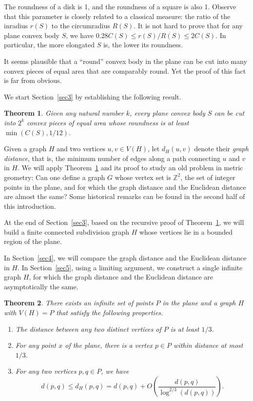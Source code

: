 \documentclass[12pt]{article}
\theoremstyle{plain}
\newtheorem{theorem}{Theorem}
\theoremstyle{definition}
\theoremstyle{remark}
\newcommand{\ZZ}{{\mathbb Z}}
\begin{document}
The roundness of a disk is 1, and the roundness of a square is also 1. Observe that this parameter is closely related to a classical measure: the ratio of the inradius $r(S)$ to the circumradius $R(S)$. It is not hard to prove that for any plane convex body $S$, we have $0.28C(S)\le r(S)/R(S)\le2C(S)$. In particular, the more elongated $S$ is, the lower its roundness.

It seems plausible that a ``round'' convex body in the plane can be cut into many convex pieces of equal area that are comparably round. Yet the proof of this fact is far from obvious.

We start Section~\ref{sec3} by establishing the following result.

\begin{theorem}\label{fat}
Given any natural number $k$, every plane convex body $S$ can be cut into $2^k$ convex pieces of equal area whose roundness is at least $\min(C(S),1/12)$.
\end{theorem}

Given a graph $H$ and two vertices $u,v\in V(H)$, let $d_H(u,v)$ denote their \emph{graph distance}, that is, the minimum number of edges along a path connecting $u$ and $v$ in $H$. We will apply Theorem~\ref{fat} and its proof to study an old problem in metric geometry: Can one define a graph $G$ whose vertex set is ${\ZZ}^2$, the set of integer points in the plane, and for which the graph distance and the Euclidean distance are almost the same? Some historical remarks can be found in the second half of this introduction.

At the end of Section~\ref{sec3}, based on the recursive proof of Theorem~\ref{fat}, we will build a finite connected subdivision graph $H$ whose vertices lie in a bounded region of the plane.
\smallskip

In Section~\ref{sec4}, we will compare the graph distance and the Euclidean distance in $H$. In Section~\ref{sec5}, using a limiting argument, we construct a single infinite graph $H$, for which the graph distance and the Euclidean distance are asymptotically the same.

\begin{theorem}\label{generalizedpinwheel}
There exists an infinite set of points $P$ in the plane and a graph $H$ with $V(H)=P$ that satisfy the following properties.
\begin{enumerate}
\item The distance between any two distinct vertices of $P$ is at least $1/3$.
\item For any point $x$ of the plane, there is a vertex $p\in P$ within distance at most $1/3$.
\item For any two vertices $p,q\in P$, we have
$$d(p,q)\le d_H(p,q)=d(p,q)+O\left(\frac{d(p,q)}{\log^{2/3}(d(p,q))}\right).$$
\end{enumerate}
\end{theorem}
\end{document}
